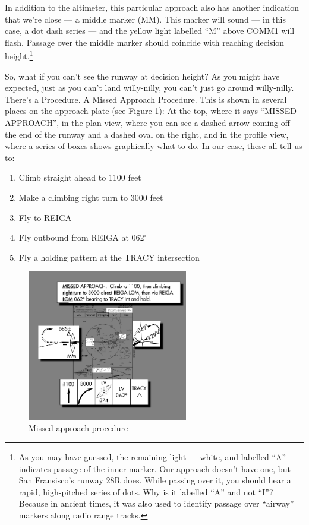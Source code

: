 In addition to the altimeter, this particular approach also has
another indication that we're close --- a middle marker (MM).  This
marker will sound --- in this case, a dot dash series --- and the
yellow light labelled ``M'' above COMM1 will flash.  Passage over the
middle marker should coincide with reaching decision
height.\footnote{As you may have guessed, the remaining light ---
  white, and labelled ``A'' --- indicates passage of the inner marker.
  Our approach doesn't have one, but San Fransisco's runway 28R does.
  While passing over it, you should hear a rapid, high-pitched series
  of dots.  Why is it labelled ``A'' and not ``I''?  Because in
  ancient times, it was also used to identify passage over ``airway''
  markers along radio range tracks.}

So, what if you can't see the runway at decision height?  As you might
have expected, just as you can't land willy-nilly, you can't just go
around willy-nilly.  There's a Procedure.  A Missed Approach
Procedure.  This is shown in several places on the approach plate (see
Figure \ref{fig:MAP}): At the top, where it says ``MISSED APPROACH'',
in the plan view, where you can see a dashed arrow coming off the end
of the runway and a dashed oval on the right, and in the profile view,
where a series of boxes shows graphically what to do.  In our case,
these all tell us to:

\begin{enumerate}
\item Climb straight ahead to 1100 feet
\item Make a climbing right turn to 3000 feet
\item Fly to REIGA
\item Fly outbound from REIGA at 062$^\circ$
\item Fly a holding pattern at the TRACY intersection
\end{enumerate}

\begin{figure}
  \begin{center}
    \includegraphics[width=7cm]{img/MAP}
    \caption{Missed approach procedure}
    \label{fig:MAP}
  \end{center}
\end{figure}

